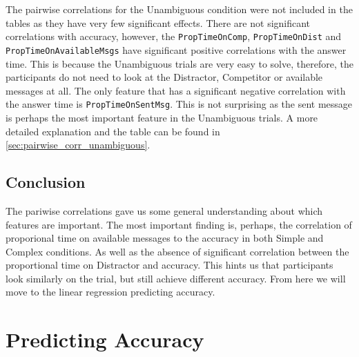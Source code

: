 \sloppy
The pairwise correlations for the Unambiguous condition were not included in the tables as they have very few significant effects. There are not significant correlations with accuracy, however, the \texttt{PropTimeOnComp}, \texttt{PropTimeOnDist} and \texttt{PropTimeOnAvailableMsgs} have significant positive correlations with the answer time. This is because the Unambiguous trials are very easy to solve, therefore, the participants do not need to look at the Distractor, Competitor or available messages at all. The only feature that has a significant negative correlation with the answer time is \texttt{PropTimeOnSentMsg}. This is not surprising as the sent message is perhaps the most important feature in the Unambiguous trials. A more detailed explanation and the table can be found in \autoref{sec:pairwise_corr_unambiguous}.
\sloppy

\subsection*{Conclusion}
The pariwise correlations gave us some general understanding about which features are important. The most important finding is, perhaps, the correlation of proporional time on available messages to the accuracy in both Simple and Complex conditions. As well as the absence of significant correlation between the proportional time on Distractor and accuracy. This hints us that participants look similarly on the trial, but still achieve different accuracy. From here we will move to the linear regression predicting accuracy. 















\section{Predicting Accuracy}
\label{sec:accuracy_model}

